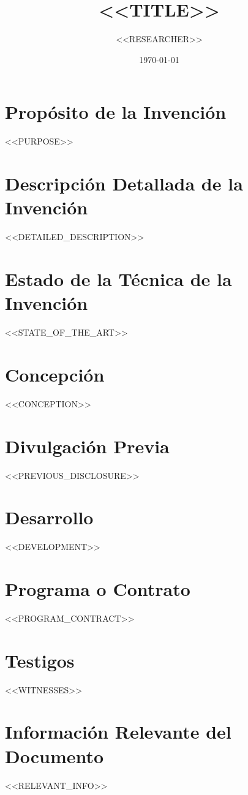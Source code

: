 \documentclass{article}
\title{<<TITLE>>}
\author{<<RESEARCHER>>}
\date{\today}
\begin{document}
\maketitle

\section*{Propósito de la Invención}
<<PURPOSE>>

\section*{Descripción Detallada de la Invención}
<<DETAILED_DESCRIPTION>>

\section*{Estado de la Técnica de la Invención}
<<STATE_OF_THE_ART>>

\section*{Concepción}
<<CONCEPTION>>

\section*{Divulgación Previa}
<<PREVIOUS_DISCLOSURE>>

\section*{Desarrollo}
<<DEVELOPMENT>>

\section*{Programa o Contrato}
<<PROGRAM_CONTRACT>>

\section*{Testigos}
<<WITNESSES>>

\section*{Información Relevante del Documento}
<<RELEVANT_INFO>>
\end{document}
